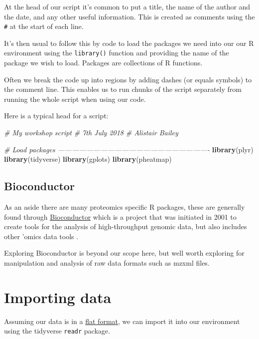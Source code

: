 \documentclass[12pt,]{book}
\newenvironment{Shaded}{\begin{snugshade}}{\end{snugshade}}
\newcommand{\KeywordTok}[1]{\textcolor[rgb]{0.13,0.29,0.53}{\textbf{#1}}}
\newcommand{\CommentTok}[1]{\textcolor[rgb]{0.56,0.35,0.01}{\textit{#1}}}
\newcommand{\NormalTok}[1]{#1}
\theoremstyle{definition}
\theoremstyle{definition}
\theoremstyle{definition}
\theoremstyle{remark}
\begin{document}
At the head of our script it's common to put a title, the name of the
author and the date, and any other useful information. This is created
as comments using the \texttt{\#} at the start of each line.

It's then usual to follow this by code to load the packages we need into
our our R environment using the \texttt{library()} function and
providing the name of the package we wish to load. Packages are
collections of R functions.

Often we break the code up into regions by adding dashes (or equals
symbols) to the comment line. This enables us to run chunks of the
script separately from running the whole script when using our code.

Here is a typical head for a script:

\begin{Shaded}
\begin{Highlighting}[]
\CommentTok{# My workshop script}
\CommentTok{# 7th July 2018}
\CommentTok{# Alistair Bailey}

\CommentTok{# Load packages ----------------------------------------------------------------}
\KeywordTok{library}\NormalTok{(plyr)}
\KeywordTok{library}\NormalTok{(tidyverse)}
\KeywordTok{library}\NormalTok{(gplots)}
\KeywordTok{library}\NormalTok{(pheatmap)}
\end{Highlighting}
\end{Shaded}

\subsection{Bioconductor}\label{biocondutor}

As an aside there are many proteomics specific R packages, these are
generally found through
\href{https://www.bioconductor.org/}{Bioconductor} which is a project
that was initiated in 2001 to create tools for the analysis of
high-throughput genomic data, but also includes other 'omics data tools
\citep[\citet{huber2015}]{gentleman2004}.

Exploring Bioconductor is beyond our scope here, but well worth
exploring for manipulation and analysis of raw data formats such as
mzxml files.

\section{Importing data}\label{importing-data}

Assuming our data is in a \protect\hyperlink{file-formats}{flat format},
we can import it into our environment using the tidyverse \texttt{readr}
package.
\end{document}
